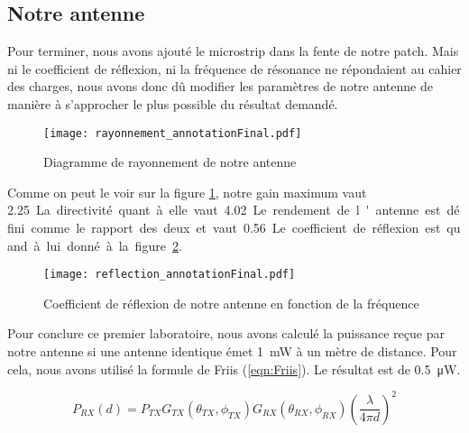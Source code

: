 \subsection{Notre antenne}
Pour terminer, nous avons ajouté le microstrip dans la fente de notre patch. Mais ni le coefficient de réflexion, ni la fréquence de résonance ne répondaient au cahier des charges, nous avons donc dû modifier les paramètres de notre antenne de manière à s'approcher le plus possible du résultat demandé.
\begin{figure}[htbp]
\centering
\texttt{[image: rayonnement\_annotationFinal.pdf]}
\caption{Diagramme de rayonnement de notre antenne}
\label{fig:rayonnement_annotationFinal}
\end{figure}
Comme on peut le voir sur la figure \ref{fig:rayonnement_annotationFinal}, notre gain maximum vaut \SI{2.25}. La directivité quant à elle vaut \SI{4.02}. Le rendement de l'antenne est défini comme le rapport des deux et vaut \SI{0.56}. Le coefficient de réflexion est quand à lui donné à la figure \ref{fig:reflection_annotationFinal}.
\begin{figure}[htbp]
\centering
\texttt{[image: reflection\_annotationFinal.pdf]}
\caption{Coefficient de réflexion de notre antenne en fonction de la fréquence}
\label{fig:reflection_annotationFinal}
\end{figure}

Pour conclure ce premier laboratoire, nous avons calculé la puissance reçue par notre antenne si une antenne identique émet \SI{1}{\milli\watt} à un mètre de distance. Pour cela, nous avons utilisé la formule de Friis (\ref{eqn:Friis}). Le résultat est de \SI{0.5}{\micro\watt}.

\begin{equation}
P_{RX}(d) = P_{TX}G_{TX}(\theta_{TX},\phi_{TX})G_{RX}(\theta_{RX},\phi_{RX})\left(\frac{\lambda}{4\pi d}\right)^2
\label{eqn:Friis}
\end{equation}


